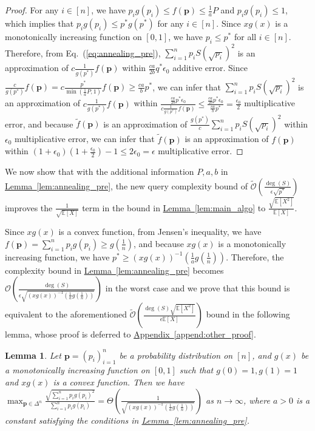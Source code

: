 \documentclass[journal]{IEEEtran}
\newtheorem{lemma}{Lemma}
\newcommand{\eq}[1]{Eq.~(\ref{eq:#1})}
\newcommand{\lem}[1]{\hyperref[lem:#1]{Lemma~\ref*{lem:#1}}}
\newcommand{\append}[1]{\hyperref[append:#1]{Appendix~\ref*{append:#1}}}
\newcommand{\E}{\mathbb{E}}
\newcommand{\syzn}[1]{{\color{violet}{#1}}}
\begin{document}
\begin{proof}
For any $i\in [n]$, we have $p_i g(p_i) \le f(\mathbf{p}) \le \frac{1}{a} P$
and $p_i g(p_i) \le 1$, which implies that $p_i g(p_i) \le p^* g(p^*)$ for any $i\in[n]$. Since $xg(x)$ is a monotonically increasing function on $[0,1]$, we have $p_i \le p^*$ for all $i\in[n]$.
Therefore, from \eq{annealing_pre}, $\sum_{i=1}^n p_i S(\sqrt{p_i})^2$ is an approximation of $c\frac{1}{g(p^*)}f(\mathbf{p})$ within $\frac{ca}{2b}q^* \epsilon_0$ additive error. Since $\frac{c}{g(p^*)}f(\mathbf{p}) = c\frac{p^*}{\min(\frac{1}{a}P,1)}f(\mathbf{p}) \ge \frac{ca}{b}p^*$, we can infer that $\sum_{i=1}^n p_i S(\sqrt{p_i})^2$ is an approximation of $c\frac{1}{g(p^*)}f(\mathbf{p})$ within $\frac{\frac{ca}{2b}p^* \epsilon_0}{c\frac{1}{g(p^*)}f(\mathbf{p})} \le \frac{\frac{ca}{2b} p^* \epsilon_0}{\frac{ca}{b} p^*}= \frac{\epsilon_0}{2}$ multiplicative error, and because  $\tilde{f}(\mathbf{p})$ is an approximation of $\frac{g(p^*)}{c}\sum_{i=1}^n p_i S(\sqrt{p_i})^2$ within $\epsilon_0$ multiplicative error, we can infer that $\tilde{f}(\mathbf{p})$ is an approximation of $f(\mathbf{p})$ within $(1+\epsilon_0)(1+\frac{\epsilon_0}{2})-1 \le 2\epsilon_0 = \epsilon$ multiplicative error.
\end{proof}

We now show that with the additional information $P,a,b$ in \lem{annealing_pre}, the new query complexity bound of $\widetilde{\mathcal{O}}\left(\frac{\deg(S)}{\epsilon\sqrt{p^{*}}}\right)$ improves the $\frac{1}{\sqrt{\E[X]}}$ term in the bound in \lem{main_algo} to $\frac{\sqrt{\E[X^2]}}{\E[X]}$.

Since $xg(x)$ is a convex function, from Jensen's inequality, we have $f(\mathbf{p}) = \sum_{i=1}^n p_i g(p_i) \ge g(\frac{1}{n})$, and because $xg(x)$ is a monotonically increasing function, we have $p^* \ge (xg(x))^{-1}(\frac{1}{a}g(\frac{1}{n}))$. Therefore, the complexity bound in \lem{annealing_pre} becomes  $\mathcal{O}\left(\frac{\deg(S)}{\epsilon \sqrt{(xg(x))^{-1}(\frac{1}{a}g(\frac{1}{n}))}}\right)$ in the worst case and %
we prove that this bound is equivalent to the aforementioned  $\widetilde{\mathcal{O}}\left(\frac{\deg(S)\sqrt{\E[X^2]}}{\epsilon \E[X]}\right)$ bound in the following lemma, whose proof is deferred to \append{other_proof}.
\begin{lemma}
    \label{lem:bound_of_annealing}
 Let $\mathbf{p}= (p_i)_{i=1}^n$ be a probability distribution on $[n]$, and $g(x)$ be a monotonically increasing function on $[0,1]$ such that $g(0) = 1,g(1) = 1$ and $xg(x)$ is a convex function. Then we have $\max_{\mathbf{p}\in \Delta^n}\frac{\sqrt{\sum_{i=1}^n p_i g(p_i)^2}}{\sum_{i=1}^n p_i g(p_i)} = \Theta\left(\frac{1}{\sqrt{(xg(x))^{-1}(\frac{1}{a}g(\frac{1}{n}))}}\right)$ as $n\to \infty$, where $a > 0$ is  a constant satisfying the conditions in \lem{annealing_pre}. %
\end{lemma}
\end{document}
